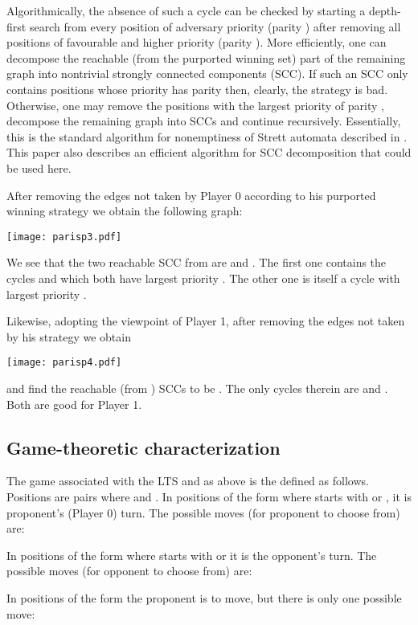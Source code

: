 Algorithmically, the absence of such a cycle can be checked by
starting a depth-first search from every position of adversary
priority (parity ) after removing all positions of favourable and
higher priority (parity ). More efficiently, one can decompose
the reachable (from the purported winning set) part of the remaining
graph into nontrivial strongly connected components (SCC). If such an
SCC only contains positions whose priority has parity  then,
clearly, the strategy is bad. Otherwise, one may remove the positions
with the largest priority of parity , decompose the remaining graph
into SCCs and continue recursively. Essentially, this is the standard
algorithm for nonemptiness of Strett automata described in
\cite{DBLP:journals/fmsd/BloemGS06}. This paper also describes an
efficient algorithm for SCC decomposition that could be used here.
\begin{example}
After removing the edges not taken by Player 0 according to his purported winning strategy we obtain the following graph: 

\texttt{[image: parisp3.pdf]}

We see that the two reachable SCC from  are  and
. The first one contains the cycles  and  which
both have largest priority . The other one is itself a cycle with
largest priority .

Likewise, adopting the viewpoint of Player 1, after removing the edges
not taken by his strategy we obtain

\texttt{[image: parisp4.pdf]}

and find the reachable (from ) SCCs to be . The only cycles therein are  and . Both are good for Player 1. 
\end{example}
\subsection{Game-theoretic characterization}

The game  associated with the LTS  and  as above
is the defined as follows.
Positions are pairs  where  and \@. 
In positions of the form  where  starts with  or , it is
proponent's (Player 0) turn. The possible moves (for proponent to choose from)
are:
   
In positions of the form  where  starts with  or  it is
the opponent's turn. The possible moves (for opponent to choose from)
 are: 
 
In positions of the form  the proponent is to move, but
there is only one possible move:
 

